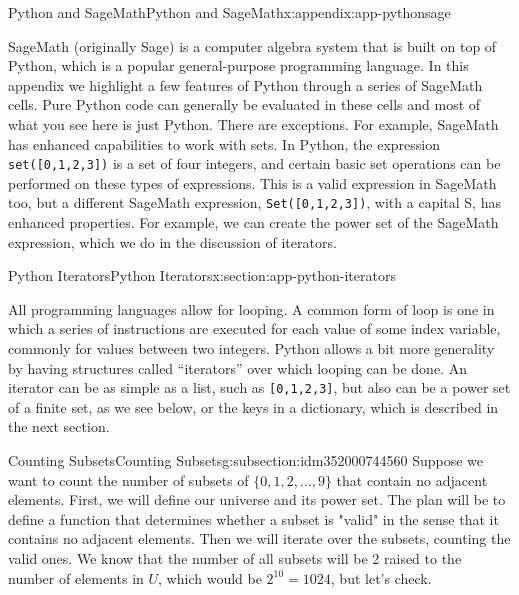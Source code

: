 \documentclass[oneside,10pt,]{book}
\newcommand{\mono}[1]{\texttt{#1}}
\begin{document}
\begin{appendixptx}{Python and SageMath}{}{Python and SageMath}{}{}{x:appendix:app-pythonsage}
\begin{introduction}{}%
SageMath (originally Sage) is a computer algebra system that is built on top of Python, which is a popular general-purpose programming language.  In this appendix we highlight a few features of Python through a series of SageMath cells.   Pure Python code can generally be evaluated in these cells and most of what you see here is just Python.   There are exceptions. For example, SageMath has  enhanced capabilities to work with sets.  In Python, the expression \mono{set([0,1,2,3])} is a set of four integers, and certain basic set operations can be performed on these types of expressions.  This is a valid expression in SageMath too, but a different SageMath expression, \mono{Set([0,1,2,3])}, with a capital S, has enhanced properties.  For example, we can create the power set of the SageMath expression, which we do in the discussion of iterators.%
\end{introduction}%
%
%
\typeout{************************************************}
\typeout{************************************************}
%
\begin{sectionptx}{Python Iterators}{}{Python Iterators}{}{}{x:section:app-python-iterators}
\begin{introduction}{}%
All programming languages allow for looping.  A common form of loop is one in which a series of instructions are executed for each value of some index variable, commonly for values between two integers.  Python allows a bit more generality by having structures called ``iterators'' over which looping can be done.   An iterator can be as simple as a list, such as \mono{[0,1,2,3]}, but also can be a power set of a finite set, as we see below, or the keys in a dictionary, which is described in the next section.%
\end{introduction}%
%
%
\typeout{************************************************}
\typeout{************************************************}
%
\begin{subsectionptx}{Counting Subsets}{}{Counting Subsets}{}{}{g:subsection:idm352000744560}
Suppose we want to count the number of subsets of \(\{0,1,2,...,9\}\) that contain no adjacent elements.  First, we will define our universe and its power set.  The plan will be to define a function that determines whether a subset is "valid" in the sense that it contains no adjacent elements.  Then we will iterate over the subsets, counting the valid ones.  We know that the number of all subsets will be 2 raised to the number of elements in \(U\), which would be \(2^{10}=1024\), but let's check.%

\end{subsectionptx}
\end{sectionptx}
\end{appendixptx}
\end{document}
